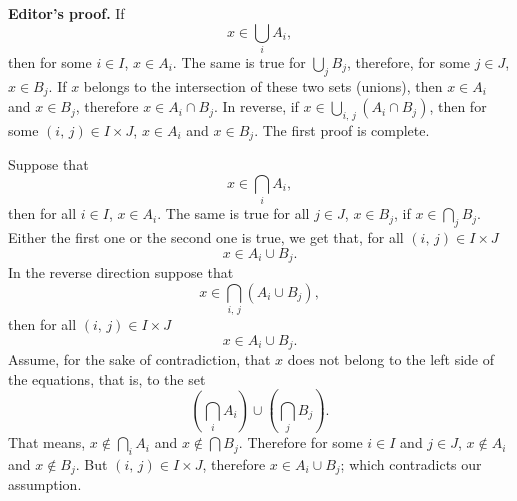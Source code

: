 \textbf{Editor's proof.} If
\[
	x \in \bigcup_i A_i,
\]
then for some $i \in I$, $x \in A_i$. The same is true for $\bigcup_j B_j$, therefore, for some $j \in J$, $x \in B_j$. If $x$ belongs to the intersection of these two sets (unions), then $x \in A_i$ and $x \in B_j$, therefore $x \in A_i \cap B_j$. In reverse, if $x \in \bigcup_{i, \, j} (A_i \cap B_j)$, then for some $(i, \, j) \in I \times J$, $x \in A_i$ and $x \in B_j$. The first proof is complete.

Suppose that
\[
	x \in \bigcap_i A_i,
\]
then for all $i \in I$, $x \in A_i$. The same is true for all $j \in J$, $x \in B_j$, if $x \in \bigcap_j B_j$. Either the first one or the second one is true, we get that, for all $(i, \, j) \in I \times J$
\[
	x \in A_i \cup B_j.
\]
In the reverse direction suppose that 
\[
	x \in \bigcap_{i, \, j} (A_i \cup B_j),
\]
then for all $(i, \, j) \in I \times J$
\[
	x \in A_i \cup B_j.
\]
Assume, for the sake of contradiction, that $x$ does not belong to the left side of the equations, that is, to the set
\[
	\left( \bigcap_i A_i \right) \cup \left( \bigcap_j B_j \right).
\]
That means, $x \not \in \bigcap_i A_i$ and $x \not \in \bigcap B_j$. Therefore for some $i \in I$ and $j \in J$, $x \not \in A_i$ and $x \not \in B_j$. But $(i, \, j) \in I \times J$, therefore $x \in A_i \cup B_j$; which contradicts our assumption.

